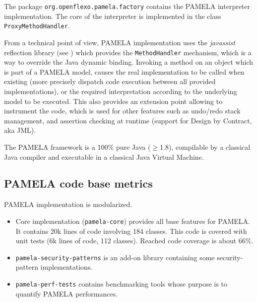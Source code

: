 The package \texttt{org.openflexo.pamela.factory} contains the PAMELA interpreter implementation. The core of the interpreter is implemented in the class \texttt{ProxyMethodHandler}.

From a technical point of view, PAMELA implementation uses the \emph{javassist} reflection library (see \cite{shigueru2000}) which provides the \texttt{MethodHandler} mechanism, which is a way to override the Java dynamic binding. Invoking a method on an object which is part of a PAMELA model, causes the real implementation to be called when existing (more precisely dispatch code execution between all provided implementations), or the required interpretation according to the underlying model to be executed. This also provides an extension point allowing to instrument the code, which is used for other features such as undo/redo stack management, and assertion checking at runtime (support for Design by Contract, aka JML).

The PAMELA framework is a 100\% pure Java ($\geq$1.8), compilable by a classical Java compiler and executable in a classical Java Virtual Machine.

\subsection{PAMELA code base metrics}

PAMELA implementation is modularized. 

\begin{itemize}
    \vspace{-0.2cm}\item Core implementation (\texttt{pamela-core}) provides all base features for PAMELA. It contains 20k lines of code involving 184 classes. This code is covered with unit tests (6k lines of code, 112 classes). Reached code coverage is about 66\%.
    \vspace{-0.2cm}\item \texttt{pamela-security-patterns} is an add-on library containing some security-pattern implementations.
    \vspace{-0.2cm}\item \texttt{pamela-perf-tests} contains benchmarking tools whose purpose is to quantify PAMELA performances. 
\end{itemize}


